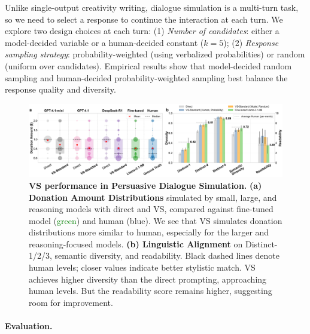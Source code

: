 Unlike single-output creativity writing, dialogue simulation is a multi-turn task, so we need to select a response to continue the interaction at each turn. 
We explore two design choices at each turn: (1) \textit{Number of candidates}: either a model-decided variable or a human-decided constant ($k=5$); (2) \textit{Response sampling strategy}: probability-weighted (using verbalized probabilities) or random (uniform over candidates). Empirical results show that model-decided random sampling and human-decided probability-weighted sampling best balance the response quality and diversity. %

\begin{figure}[t] %
    \centering
    \includegraphics[width=\textwidth]{figures/dialogue_simulation/combined_visualization.pdf}
    \vspace{-1em}
    \caption{\textbf{VS performance in Persuasive Dialogue Simulation.}
    \textbf{(a) Donation Amount Distributions} simulated by small, large, and reasoning models with direct and VS, compared against fine-tuned model (\textcolor{Green}{green}) and human (\textcolor{ProcessBlue}{blue}). 
    We see that VS simulates donation distributions more similar to human, especially for the larger and reasoning-focused models. 
    \textbf{(b)  Linguistic Alignment} on Distinct-1/2/3, semantic diversity, and readability. Black dashed lines denote human levels; closer values indicate better stylistic match.
    VS achieves higher diversity than the direct prompting, approaching human levels. But the readability score remains higher, suggesting room for improvement.     
    \vspace{-2em}
    }
    \label{fig:dialogue_simulation_combined_performance}
\end{figure}



\paragraph{Evaluation.} 

